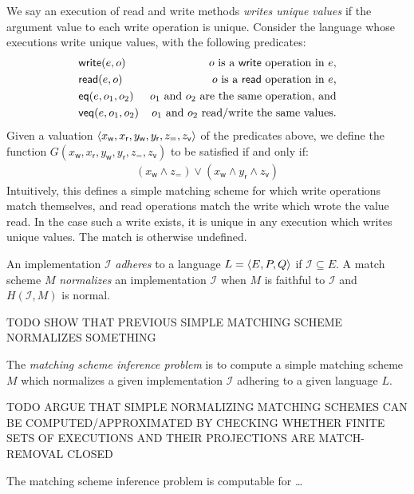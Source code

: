 \begin{example}

  We say an execution of read and write methods \emph{writes unique values} if
  the argument value to each write operation is unique. Consider the language
  whose executions write unique values, with the following predicates:
  \begin{align*}
    & \mathsf{write}(e,o) & \text{$o$ is a {\sf write} operation in $e$}, \\
    & \mathsf{read}(e,o) & \text{$o$ is a {\sf read} operation in $e$,} \\
    & \mathsf{eq}(e,o_1,o_2) & \text{$o_1$ and $o_2$ are the same operation, and} \\
    & \mathsf{veq}(e,o_1,o_2) & \text{$o_1$ and $o_2$ read/write the same values.}
  \end{align*}
  Given a valuation ${\left\langle{x_\mathsf{w}, x_\mathsf{r}, y_\mathsf{w},
  y_\mathsf{r}, z_\mathsf{=}, z_\mathsf{v}}\right\rangle}$ of the predicates above, we define
  the function $G(x_\mathsf{w}, x_\mathsf{r}, y_\mathsf{w}, y_\mathsf{r},
  z_\mathsf{=}, z_\mathsf{v})$ to be satisfied if and only if:
  \begin{align*}
    ( x_\mathsf{w} \land z_\mathsf{=} )
    \lor ( x_\mathsf{w} \land y_\mathsf{r} \land z_\mathsf{v} )
  \end{align*}
  Intuitively, this defines a simple matching scheme for which write
  operations match themselves, and read operations match the write which wrote
  the value read. In the case such a write exists, it is unique in any
  execution which writes unique values. The match is otherwise undefined.

\end{example}

An implementation $\mathcal{I}$ \emph{adheres} to a language $L = {\left\langle{E,P,Q}\right\rangle}$
if $\mathcal{I} \subseteq E$. A match scheme $M$ \emph{normalizes} an
implementation $\mathcal{I}$ when $M$ is faithful to $\mathcal{I}$ and
$H(\mathcal{I},M)$ is normal.

\begin{example}

  TODO SHOW THAT PREVIOUS SIMPLE MATCHING SCHEME NORMALIZES SOMETHING

\end{example}

\begin{definition}

  The \emph{matching scheme inference problem} is to compute a simple matching
  scheme $M$ which normalizes a given implementation $\mathcal{I}$ adhering to
  a given language $L$.

\end{definition}

TODO ARGUE THAT SIMPLE NORMALIZING MATCHING SCHEMES CAN BE
COMPUTED/APPROXIMATED BY CHECKING WHETHER FINITE SETS OF EXECUTIONS AND THEIR
PROJECTIONS ARE MATCH-REMOVAL CLOSED

\begin{theorem}

  The matching scheme inference problem is computable for \ldots

\end{theorem}
